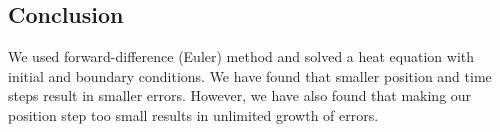 \subsection{Conclusion}

We used forward-difference (Euler) method and solved a heat equation with initial and boundary conditions. We have found that smaller position and time steps result in smaller errors. However, we have also found that making our position step too small results in unlimited growth of errors.